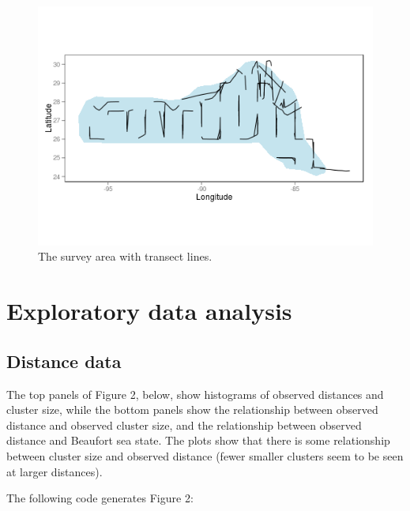 \documentclass[]{amsart}
\makeatletter
\def\maxwidth{\ifdim\Gin@nat@width>\linewidth\linewidth
\else\Gin@nat@width\fi}
\let\Oldincludegraphics\includegraphics
\renewcommand{\includegraphics}[1]{\Oldincludegraphics[width=\maxwidth]{#1}}
\makeatother
\begin{document}
\begin{figure}[htbp]
\centering
\includegraphics{mexico-figs/areawithtransects.png}
\caption{The survey area with transect lines.}
\end{figure}

\section{Exploratory data analysis}

\subsection{Distance data}

The top panels of Figure 2, below, show histograms of observed distances
and cluster size, while the bottom panels show the relationship between
observed distance and observed cluster size, and the relationship
between observed distance and Beaufort sea state. The plots show that
there is some relationship between cluster size and observed distance
(fewer smaller clusters seem to be seen at larger distances).

The following code generates Figure 2:
\end{document}
